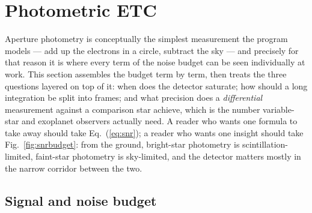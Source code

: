 \section{Photometric ETC}
\label{sec:photometry}

Aperture photometry is conceptually the simplest measurement the program
models --- add up the electrons in a circle, subtract the sky --- and
precisely for that reason it is where every term of the noise budget can
be seen individually at work. This section assembles the budget term by
term, then treats the three questions layered on top of it: when does the
detector saturate; how should a long integration be split into frames;
and what precision does a \emph{differential} measurement against a
comparison star achieve, which is the number variable-star and exoplanet
observers actually need. A reader who wants one formula to take away
should take Eq.~(\ref{eq:snr}); a reader who wants one insight should
take Fig.~\ref{fig:snrbudget}: from the ground, bright-star photometry is
scintillation-limited, faint-star photometry is sky-limited, and the
detector matters mostly in the narrow corridor between the two.

\subsection{Signal and noise budget}
\label{sec:noise}

